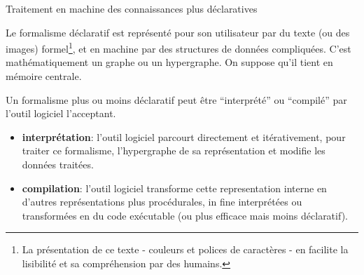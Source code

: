 \documentclass[final,a4,xcolor={svgnames,dvipsnames}]{beamer}
\begin{document}
 \begin{frame}{Traitement en machine des connaissances plus déclaratives}

   Le formalisme déclaratif est représenté pour son utilisateur par du
   texte (ou des images) formel\footnote{La présentation de ce texte -
   couleurs et polices de caractères - en facilite la lisibilité et sa
   compréhension par des humains.}, et en machine par des structures
   de données compliquées. C'est mathématiquement un graphe ou un
   hypergraphe. On suppose qu'il tient en mémoire centrale.
   
   Un formalisme plus ou moins déclaratif peut être ``interprété'' ou
   ``compilé'' par l'outil logiciel l'acceptant.

   \begin{itemize}
   \item \textbf{interprétation}: l'outil logiciel parcourt
     directement et itérativement, pour traiter ce formalisme,
     l'hypergraphe de sa représentation et modifie les données
     traitées.
     
   \item \textbf{compilation}: l'outil logiciel transforme cette
     representation interne en d'autres représentations plus
     procédurales, in fine interprétées ou transformées en du code
     exécutable (ou plus efficace mais moins déclaratif).
     
   \end{itemize}
   
 \end{frame}
\end{document}
